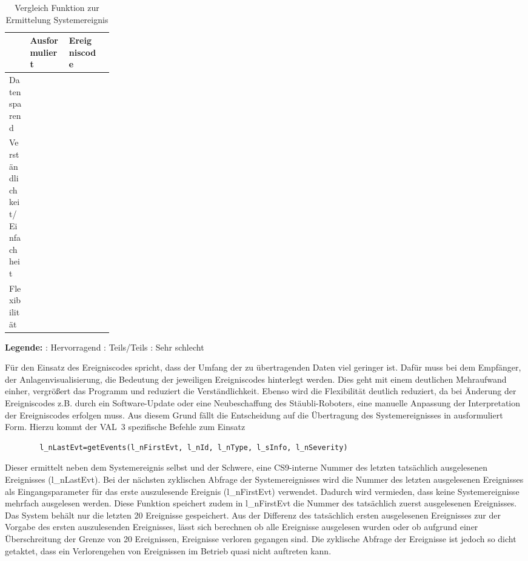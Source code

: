 \documentclass[ a4paper,
                oneside,
                toc=bibliography,
                toc=listof
                ]{scrbook}
\begin{document}
	\begin{table}[h]
		\centering
		\caption{Vergleich Funktion zur Ermittelung Systemereignis}
		\label{tab:getEvent-vergleich}
		\begin{tabularx}{\linewidth}{p{0.2\linewidth} >{\centering\arraybackslash}X >{\centering\arraybackslash}X >{\centering\arraybackslash}X}
			\hline
			\textbf{ } & \textbf{Ausformuliert} & \textbf{Ereigniscode}\\
			\hline
			Datensparend & \harveyBallQuarter& \harveyBallFull\\
			Verständlichkeit/Einfachheit & \harveyBallThreeQuarter & \harveyBallQuarter\\
			Flexibilität & \harveyBallThreeQuarter & \harveyBallQuarter \\
			\hline
		\end{tabularx}
		\begin{flushleft}
			\textbf{Legende:} \harveyBallFull: Hervorragend   \harveyBallHalf: Teils/Teils	\harveyBallNone: Sehr schlecht
		\end{flushleft}
	\end{table}
	Für den Einsatz des Ereigniscodes spricht, dass der Umfang der zu übertragenden Daten viel geringer ist. Dafür muss bei dem Empfänger, der Anlagenvisualisierung, die Bedeutung der jeweiligen Ereigniscodes hinterlegt werden. Dies geht mit einem deutlichen Mehraufwand einher, vergrößert das Programm und reduziert die Verständlichkeit. Ebenso wird die Flexibilität deutlich reduziert, da bei Änderung der Ereigniscodes z.B. durch ein Software-Update oder eine Neubeschaffung des Stäubli-Roboters, eine manuelle Anpassung der Interpretation der Ereigniscodes erfolgen muss. Aus diesem Grund fällt die Entscheidung auf die Übertragung des Systemereignisses in ausformuliert Form.
	Hierzu kommt der VAL~3 spezifische Befehle zum Einsatz
	\begin{lstlisting}
		l_nLastEvt=getEvents(l_nFirstEvt, l_nId, l_nType, l_sInfo, l_nSeverity)
	\end{lstlisting}
	Dieser ermittelt neben dem Systemereignis selbst und der Schwere, eine CS9-interne Nummer des letzten tatsächlich ausgelesenen Ereignisses (l\_nLastEvt).
	Bei der nächsten zyklischen Abfrage der Systemereignisses wird die Nummer des letzten ausgelesenen Ereignisses als Eingangsparameter für das erste auszulesende Ereignis (l\_nFirstEvt) verwendet. Dadurch wird vermieden, dass keine Systemereignisse mehrfach ausgelesen werden. Diese Funktion speichert zudem in l\_nFirstEvt die Nummer des tatsächlich zuerst ausgelesenen Ereignisses. Das System behält nur die letzten 20 Ereignisse gespeichert. Aus der Differenz des tatsächlich ersten ausgelesenen Ereignisses zur der Vorgabe des ersten auszulesenden Ereignisses, lässt sich berechnen ob alle Ereignisse ausgelesen wurden oder ob aufgrund einer Überschreitung der Grenze von 20 Ereignissen, Ereignisse verloren gegangen sind. Die zyklische Abfrage der Ereignisse ist jedoch so dicht getaktet, dass ein Verlorengehen von Ereignissen im Betrieb quasi nicht auftreten kann.\\
\end{document}
